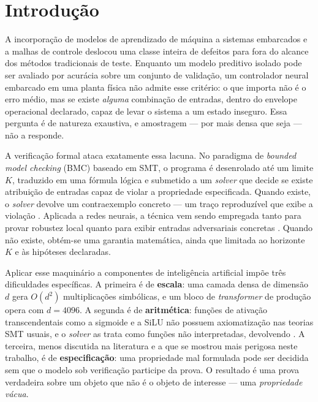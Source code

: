 \section{Introdução}
\label{sec:introducao}

A incorporação de modelos de aprendizado de máquina a sistemas embarcados e a malhas de
controle deslocou uma classe inteira de defeitos para fora do alcance dos métodos
tradicionais de teste. Enquanto um modelo preditivo isolado pode ser avaliado por acurácia
sobre um conjunto de validação, um controlador neural embarcado em uma planta física não
admite esse critério: o que importa não é o erro médio, mas se existe \emph{alguma}
combinação de entradas, dentro do envelope operacional declarado, capaz de levar o sistema
a um estado inseguro. Essa pergunta é de natureza exaustiva, e amostragem --- por mais
densa que seja --- não a responde.

A verificação formal ataca exatamente essa lacuna. No paradigma de \textit{bounded model
checking} (BMC) baseado em SMT, o programa é desenrolado até um limite $K$, traduzido em
uma fórmula lógica e submetido a um \textit{solver} que decide se existe atribuição de
entradas capaz de violar a propriedade especificada. Quando existe, o \textit{solver}
devolve um contraexemplo concreto --- um traço reproduzível que exibe a violação
\cite{cordeiro2012smt}. Aplicada a redes neurais, a técnica vem sendo empregada tanto para
provar robustez local quanto para exibir entradas adversariais concretas
\cite{huang2017robustness}. Quando não existe, obtém-se uma garantia matemática, ainda que
limitada ao horizonte $K$ e às hipóteses declaradas.

Aplicar esse maquinário a componentes de inteligência artificial impõe três dificuldades
específicas. A primeira é de \textbf{escala}: uma camada densa de dimensão $d$ gera
$O(d^2)$ multiplicações simbólicas, e um bloco de \textit{transformer} de produção opera
com $d = 4096$. A segunda é de \textbf{aritmética}: funções de ativação transcendentais
como a sigmoide e a SiLU não possuem axiomatização nas teorias SMT usuais, e o
\textit{solver} as trata como funções não interpretadas, devolvendo . A
terceira, menos discutida na literatura e a que se mostrou mais perigosa neste trabalho, é
de \textbf{especificação}: uma propriedade mal formulada pode ser decidida sem que o modelo
sob verificação participe da prova. O resultado é uma prova verdadeira sobre um objeto que
não é o objeto de interesse --- uma \emph{propriedade vácua}.

